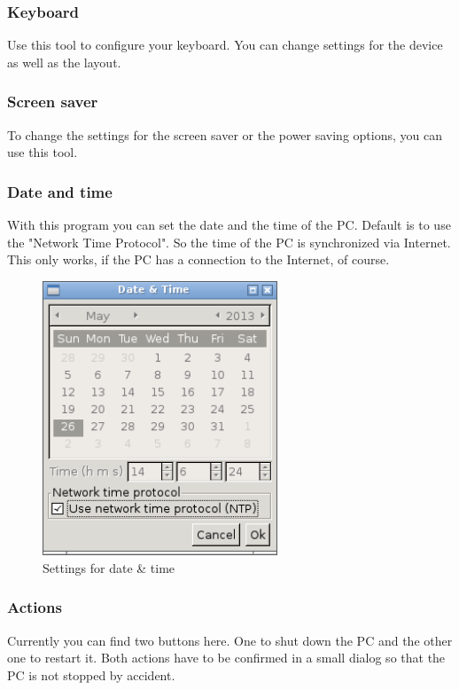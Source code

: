 \documentclass[a4paper,12pt,twoside]{article}
\begin{document}
\subsubsection{Keyboard}
\label{sct:keyboard}
Use this tool to configure your keyboard. You can change settings for
the device as well as the layout.


\subsubsection{Screen saver}
\label{sct:screen_saver}
To change the settings for the screen saver or the power saving options,
you can use this tool.


\subsubsection{Date and time}
\label{sct:date_time}
With this program you can set the date and the time of the PC. Default
is to use the "Network Time Protocol". So
the time of the PC is synchronized via Internet. This only works, if
the PC has a connection to the Internet, of course.

\begin{figure}
    \centering
    \includegraphics[width=7cm]{efaLiveen-img/efaLiveen-img26.png}
    \caption{Settings for date \& time}
    \label{fig:date_time}
\end{figure}


\subsubsection{Actions}
\label{sct:actions}
Currently you can find two buttons here. One to shut down the PC and the
other one to restart it. Both actions have to be confirmed in a small
dialog so that the PC is not stopped by accident.
\end{document}
